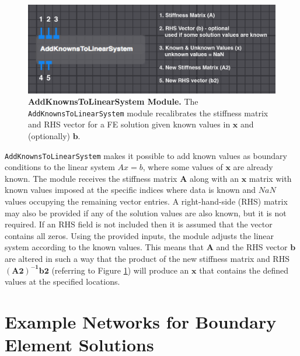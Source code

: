 \begin{figure}[b]
\begin{center}
\includegraphics[width=\textwidth]{ECGToolkitGuide_figures/AddKnowns.png}
\caption{{\bf AddKnownsToLinearSystem Module.} The {\tt AddKnownsToLinearSystem} module recalibrates  the stiffness matrix and RHS vector for a FE solution given known values in $\mathbf{x}$ and (optionally) $\mathbf{b}$.}
\label{fig:AddKnowns}
\end{center}
\vspace{-.25 in}
\end{figure}

{\tt AddKnownsToLinearSystem} makes it possible to add known values as boundary conditions
to the linear system $Ax=b$, where some values of
$\mathbf{x}$ are already known. 
The module receives the stiffness matrix $\mathbf{A}$ along with an $\mathbf{x}$ matrix with known values imposed at the specific indices where data is known and $NaN$ values occupying the remaining vector entries. 
A right-hand-side (RHS) matrix may also be provided if any of the solution values are also known, but it is not required. 
If an RHS field is not included then it is assumed that the vector contains all zeros. %
Using the provided inputs, the module adjusts the linear system according to the known values. 
This means that $\mathbf{A}$ and the RHS vector $\mathbf{b}$ are altered in such a way that the product of the new stiffness matrix and RHS $\mathbf{(A2)^{-1}} \mathbf{b2}$ (referring to Figure \ref{fig:AddKnowns}) will produce an $\mathbf{x}$ that contains the defined values at the specified locations. 

\section{Example Networks for Boundary Element Solutions}

